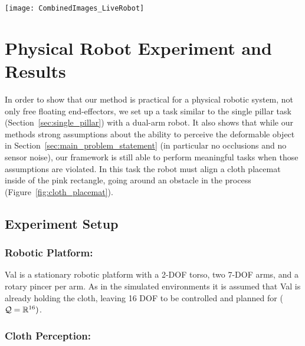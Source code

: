 
\begin{figure*}[ht]
    \centering
    \texttt{[image: CombinedImages\_LiveRobot]}
    \vspace{-1.7in}
    \caption{Cloth placemat task. The placemat starts on the far side of an obstacle and must be aligned with the pink rectangle near the robot.}
    \label{fig:cloth_placemat}
\end{figure*}



\section{Physical Robot Experiment and Results}
\label{sec:live_robot}

In order to show that our method is practical for a physical robotic system, not only free floating end-effectors, we set up a task similar to the single pillar task (Section~\ref{sec:single_pillar}) with a dual-arm robot. It also shows that while our methods strong assumptions about the ability to perceive the deformable object in Section~\ref{sec:main_problem_statement} (in particular no occlusions and no sensor noise), our framework is still able to perform meaningful tasks when those assumptions are violated. In this task the robot must align a cloth placemat inside of the pink rectangle, going around an obstacle in the process (Figure~\ref{fig:cloth_placemat}).


\subsection{Experiment Setup}

\subsubsection{Robotic Platform:}
Val is a stationary robotic platform with a 2-DOF torso, two 7-DOF arms, and a rotary pincer per arm. As in the simulated environments it is assumed that Val is already holding the cloth, leaving 16 DOF to be controlled and planned for ($\mathcal{Q} = \mathbb{R}^{16})$.


\subsubsection{Cloth Perception:}
\label{sec:cloth_perception}

